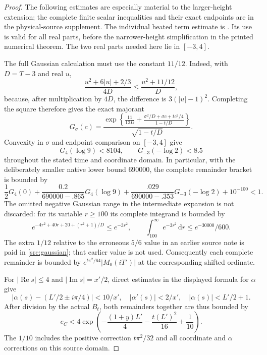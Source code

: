 \documentclass[11pt,a4paper]{article}
\theoremstyle{definition}
\theoremstyle{remark}
\newcommand{\dd}{\mathrm d}
\begin{document}
\begin{proof}
The following estimates are especially material to the larger-height
extension; the complete finite scalar inequalities and their exact
endpoints are in the physical-source supplement.  The individual heated
term estimate is \cite[Proposition 6.1]{Polymath}.  Its use is valid for
all real parts, before the narrower-height simplification in the printed
numerical theorem.  The two real parts needed here lie in $[-3,4]$.

The full Gaussian calculation must use the constant $11/12$.  Indeed,
with $D=T-3$ and real $u$,
\[
 \frac{u^2+6|u|+2/3}{4D}\leq\frac{u^2+11/12}{D},
\]
because, after multiplication by $4D$, the difference is
$3(|u|-1)^2$.  Completing the square therefore gives the exact majorant
\begin{equation}
 G_\sigma(c)=
 \frac{\exp\left\{\frac{11}{12D}
    +\frac{\sigma^2/D+\sigma c+tc^2/4}{1-t/D}\right\}}
      {\sqrt{1-t/D}}.
 \label{src:gaussian}
\end{equation}
Convexity in $\sigma$ and endpoint comparison on $[-3,4]$ give
\[
 G_4(\log9)<8104,\qquad G_{-3}(-\log2)<8.5
\]
throughout the stated time and coordinate domain.  In particular, with
the deliberately smaller native lower bound $690000$, the complete
remainder bracket is bounded by
\[
 \frac12G_4(0)+\frac{0.2}{690000-.865}G_4(\log9)
 +\frac{.029}{690000-.353}G_{-3}(-\log2)+10^{-100}<1.
\]
The omitted negative Gaussian range in the intermediate expansion is
not discarded: for its variable $r\geq100$ its complete integrand is
bounded by
\[
 e^{-4r^2+40r+20+(r^2+1)/D}\leq e^{-3r^2},
 \qquad
 \int_{100}^{\infty}e^{-3r^2}\,\dd r
           \leq e^{-30000}/600.
\]
The extra $1/12$ relative to the erroneous $5/6$ value in an earlier
source note is paid in \eqref{src:gaussian}; that earlier value is not
used.  Consequently each complete remainder is bounded by
$e^{t\pi^2/64}|M_0(iT')|$ at the corresponding shifted ordinate.

For $|\operatorname{Re}s|\leq4$ and $|\operatorname{Im}s|=x'/2$,
direct estimates in the displayed formula for $\alpha$ give
\[
 |\alpha(s)-(L'/2\pm i\pi/4)|<10/x',\quad
 |\alpha'(s)|<2/x',\quad |\alpha(s)|<L'/2+1.
\]
After division by the actual $B_t$, both remainders together are thus
bounded by
\begin{equation}
 e_C<4\exp\left(-\frac{(1+y)L'}4-\frac{t(L')^2}{16}
                            +\frac1{10}\right).
 \label{src:heat-physical}
\end{equation}
The $1/10$ includes the positive correction $t\pi^2/32$ and all
coordinate and $\alpha$ corrections on this source domain.


\end{proof}
\end{document}
